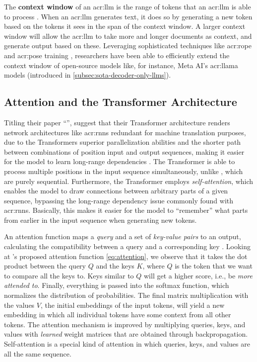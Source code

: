 The \textbf{context window} of an \acrshort{acr:llm} is the range of tokens that an \acrshort{acr:llm} is able to process \citep[1]{zhuPoSEEfficientContext2024}. When an \acrshort{acr:llm} generates text, it does so by generating a new token based on the tokens it sees in the span of the context window. A larger context window will allow the \acrshort{acr:llm} to take more and longer documents as context, and generate output based on these. Leveraging sophisticated techniques like \gls{acr:rope} \citep{suRoFormerEnhancedTransformer2024} and \gls{acr:pose} training \citep{zhuPoSEEfficientContext2024}, researchers have been able to efficiently extend the context window of open-source models like, for instance, Meta AI's \acrshort{acr:llama} models (introduced in \autoref{subsec:sota-decoder-only-llms}).


\subsection{Attention and the Transformer Architecture}
\label{subsec:attention-and-the-transformer-architecture}

Titling their paper \enquote{}, \cite{vaswaniAttentionAllYou2017} suggest that their Transformer architecture renders network architectures like \glspl{acr:rnn} redundant for machine translation purposes, due to the Transformers superior parallelization abilities and the shorter path between combinations of position input and output sequences, making it easier for the model to learn long-range dependencies \citep[6]{vaswaniAttentionAllYou2017}. The Transformer is able to process multiple positions in the input sequence simultaneously, unlike , which are purely sequential. Furthermore, the Transformer employs \textit{self-attention}, which enables the model to draw connections between arbitrary parts of a given sequence, bypassing the long-range dependency issue commonly found with \glspl{acr:rnn}. Basically, this makes it easier for the model to \enquote{remember} what parts from earlier in the input sequence when generating new tokens.

An attention function maps a \textit{query} and a set of \textit{key-value pairs} to an output, calculating the compatibility between a query and a corresponding key \citep[3]{vaswaniAttentionAllYou2017}. Looking at \citeauthor{vaswaniAttentionAllYou2017}'s proposed attention function \eqref{eq:attention}, we observe that it takes the dot product between the query $Q$ and the keys $K$, where $Q$ is the token that we want to compare all the keys to. Keys similar to $Q$ will get a higher score, i.e., be \textit{more attended to}. Finally, everything is passed into the softmax function, which normalizes the distribution of probabilities. The final matrix multiplication with the values $V$, the initial embeddings of the input tokens, will yield a new embedding in which all individual tokens have some context from all other tokens. The attention mechanism is improved by multiplying queries, keys, and values with \textit{learned} weight matrices that are obtained through backpropagation. Self-attention is a special kind of attention in which queries, keys, and values are all the same sequence.

